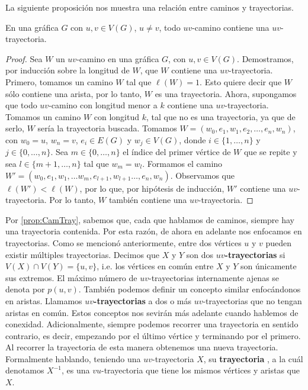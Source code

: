 La siguiente proposici\'on nos muestra una relaci\'on entre caminos y
trayectorias.

\begin{proposicion}
\label{prop:CamTray}
    En una gr\'afica $G$ con $u, v \in V(G)$, $u \ne v$, todo $uv$-camino
    contiene una $uv$-trayectoria.
\end{proposicion}

\begin{proof}
    Sea $W$ un $uv$-camino en una gr\'afica $G$, con $u,v \in V(G)$.
    Demostramos, por inducci\'on sobre la longitud de $W$, que $W$ contiene una
    $uv$-trayectoria. Primero, tomamos un camino $W$ tal que $\ell(W)=1$. Esto
    quiere decir que $W$ s\'olo contiene una arista, por lo tanto, $W$ es una
    trayectoria. Ahora, supongamos que todo $uv$-camino con longitud menor a $k$
    contiene una $uv$-trayectoria. Tomamos un camino $W$ con longitud $k$, tal
    que no es una trayectoria, ya que de serlo, $W$ ser\'ia la trayectoria
    buscada. Tomamos $W= (w_0,e_1,w_1,e_2, \dots, e_n,w_n)$, con $w_0=u$,
    $w_n=v$, $e_i \in E(G)$ y $w_j \in V(G)$, donde $i \in \{1, \dots, n\}$ y $j
    \in \{0, \dots, n\}$. Sea $m \in \{0, \dots, n\}$ el \'indice del primer
    v\'ertice de $W$ que se repite y sea $l \in \{m+1, \dots, n\}$ tal que $w_m
    = w_l$. Formamos el camino $W'= (w_0,e_1,w_1,\dots w_m, e_{l+1}, w_{l+1}
    \dots, e_n,w_n)$. Observamos que $\ell(W')<\ell(W)$, por lo que, por
    hip\'otesis de inducci\'on, $W'$ contiene una $uv$-trayectoria. Por lo
    tanto, $W$ tambi\'en contiene una $uv$-trayectoria.
\end{proof}

Por \cref{prop:CamTray}, sabemos que, cada que hablamos de caminos, siempre hay
una trayectoria contenida. Por esta raz\'on, de ahora en adelante nos enfocamos
en trayectorias. Como se mencion\'o anteriormente, entre dos v\'ertices $u$ y
$v$ pueden existir m\'ultiples trayectorias. Decimos que $X$ y $Y$ son dos
\textbf{$uv$-trayectorias}  si
$V(X)\cap V(Y)=\{u,v\}$, i.e. los v\'ertices en com\'un entre $X$ y $Y$ son
\'unicamente sus extremos. El m\'aximo n\'umero de $uv$-trayectorias
internamente ajenas se denota por $p(u,v)$. Tambi\'en podemos definir un
concepto similar enfoc\'andonos en aristas. Llamamos \textbf{$uv$-trayectorias}
 a dos o m\'as $uv$-trayectorias
que no tengan aristas en com\'un. Estos conceptos nos sevir\'an m\'as adelante
cuando hablemos de conexidad. Adicionalmente, siempre podemos recorrer una
trayectoria en sentido contrario, es decir, empezando por el \'ultimo v\'ertice
y terminando por el primero. Al recorrer la trayectoria de esta manera obtenemos
una nueva trayectoria. Formalmente hablando, teniendo una $uv$-trayectoria $X$,
su \textbf{trayectoria} , a la cu\'al denotamos
$X^{-1}$, es una $vu$-trayectoria que tiene los mismos v\'ertices y aristas que
$X$.

